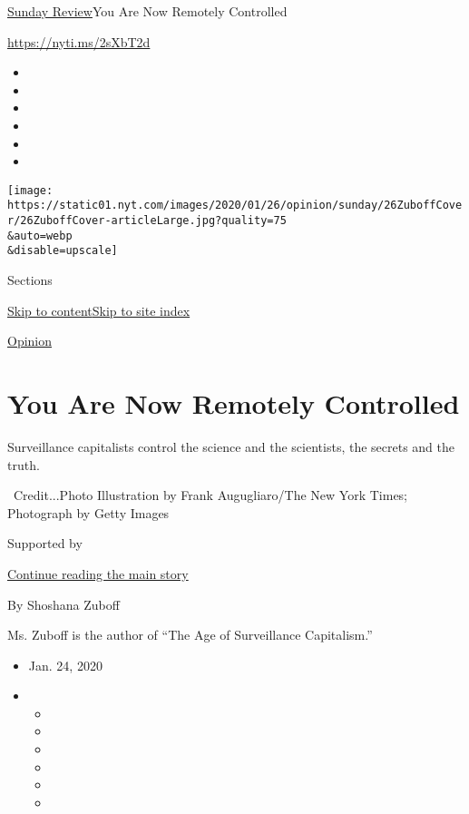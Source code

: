 \href{/section/opinion/sunday}{Sunday Review}\textbar{}You Are Now
Remotely Controlled

\url{https://nyti.ms/2sXbT2d}

\begin{itemize}
\item
\item
\item
\item
\item
\item
\end{itemize}

\texttt{[image: https://static01.nyt.com/images/2020/01/26/opinion/sunday/26ZuboffCover/26ZuboffCover-articleLarge.jpg?quality=75\\\&auto=webp\\\&disable=upscale]}

Sections

\protect\hyperlink{site-content}{Skip to
content}\protect\hyperlink{site-index}{Skip to site index}

\href{/section/opinion}{Opinion}

\hypertarget{you-are-now-remotely-controlled}{%
\section{You Are Now Remotely
Controlled}\label{you-are-now-remotely-controlled}}

Surveillance capitalists control the science and the scientists, the
secrets and the truth.

~Credit...Photo Illustration by Frank Augugliaro/The New York Times;
Photograph by Getty Images

Supported by

\protect\hyperlink{after-sponsor}{Continue reading the main story}

By Shoshana Zuboff

Ms. Zuboff is the author of ``The Age of Surveillance Capitalism.''

\begin{itemize}
\item
  Jan. 24, 2020
\item
  \begin{itemize}
  \item
  \item
  \item
  \item
  \item
  \item
  \end{itemize}
\end{itemize}

